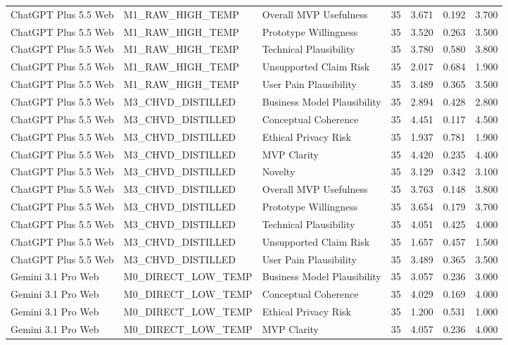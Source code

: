 \documentclass[10pt]{article}
\begin{document}
\begin{landscape}
\begin{longtable}{lllrrrr}
ChatGPT Plus 5.5 Web & M1\_RAW\_HIGH\_TEMP & Overall MVP Usefulness & 35 & 3.671 & 0.192 & 3.700 \\
ChatGPT Plus 5.5 Web & M1\_RAW\_HIGH\_TEMP & Prototype Willingness & 35 & 3.520 & 0.263 & 3.500 \\
ChatGPT Plus 5.5 Web & M1\_RAW\_HIGH\_TEMP & Technical Plausibility & 35 & 3.780 & 0.580 & 3.800 \\
ChatGPT Plus 5.5 Web & M1\_RAW\_HIGH\_TEMP & Unsupported Claim Risk & 35 & 2.017 & 0.684 & 1.900 \\
ChatGPT Plus 5.5 Web & M1\_RAW\_HIGH\_TEMP & User Pain Plausibility & 35 & 3.489 & 0.365 & 3.500 \\
ChatGPT Plus 5.5 Web & M3\_CHVD\_DISTILLED & Business Model Plausibility & 35 & 2.894 & 0.428 & 2.800 \\
ChatGPT Plus 5.5 Web & M3\_CHVD\_DISTILLED & Conceptual Coherence & 35 & 4.451 & 0.117 & 4.500 \\
ChatGPT Plus 5.5 Web & M3\_CHVD\_DISTILLED & Ethical Privacy Risk & 35 & 1.937 & 0.781 & 1.900 \\
ChatGPT Plus 5.5 Web & M3\_CHVD\_DISTILLED & MVP Clarity & 35 & 4.420 & 0.235 & 4.400 \\
ChatGPT Plus 5.5 Web & M3\_CHVD\_DISTILLED & Novelty & 35 & 3.129 & 0.342 & 3.100 \\
ChatGPT Plus 5.5 Web & M3\_CHVD\_DISTILLED & Overall MVP Usefulness & 35 & 3.763 & 0.148 & 3.800 \\
ChatGPT Plus 5.5 Web & M3\_CHVD\_DISTILLED & Prototype Willingness & 35 & 3.654 & 0.179 & 3.700 \\
ChatGPT Plus 5.5 Web & M3\_CHVD\_DISTILLED & Technical Plausibility & 35 & 4.051 & 0.425 & 4.000 \\
ChatGPT Plus 5.5 Web & M3\_CHVD\_DISTILLED & Unsupported Claim Risk & 35 & 1.657 & 0.457 & 1.500 \\
ChatGPT Plus 5.5 Web & M3\_CHVD\_DISTILLED & User Pain Plausibility & 35 & 3.489 & 0.365 & 3.500 \\
Gemini 3.1 Pro Web & M0\_DIRECT\_LOW\_TEMP & Business Model Plausibility & 35 & 3.057 & 0.236 & 3.000 \\
Gemini 3.1 Pro Web & M0\_DIRECT\_LOW\_TEMP & Conceptual Coherence & 35 & 4.029 & 0.169 & 4.000 \\
Gemini 3.1 Pro Web & M0\_DIRECT\_LOW\_TEMP & Ethical Privacy Risk & 35 & 1.200 & 0.531 & 1.000 \\
Gemini 3.1 Pro Web & M0\_DIRECT\_LOW\_TEMP & MVP Clarity & 35 & 4.057 & 0.236 & 4.000 \\

\end{longtable}
\end{landscape}
\end{document}
